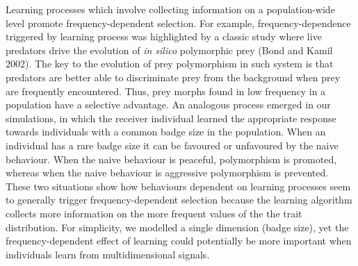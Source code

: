 \documentclass[
  12pt,
]{article}
\begin{document}
Learning processes which involve collecting information on a
population-wide level promote frequency-dependent selection. For
example, frequency-dependence triggered by learning process was
highlighted by a classic study where live predators drive the evolution
of \emph{in silico} polymorphic prey (Bond and Kamil 2002). The key to
the evolution of prey polymorphism in such system is that predators are
better able to discriminate prey from the background when prey are
frequently encountered. Thus, prey morphs found in low frequency in a
population have a selective advantage. An analogous process emerged in
our simulations, in which the receiver individual learned the
appropriate response towards individuals with a common badge size in the
population. When an individual has a rare badge size it can be favoured
or unfavoured by the naive behaviour. When the naive behaviour is
peaceful, polymorphism is promoted, whereas when the naive behaviour is
aggressive polymorphism is prevented. These two situations show how
behaviours dependent on learning processes seem to generally trigger
frequency-dependent selection because the learning algorithm collects
more information on the more frequent values of the the trait
distribution. For simplicity, we modelled a single dimension (badge
size), yet the frequency-dependent effect of learning could potentially
be more important when individuals learn from multidimensional signals.
\end{document}
